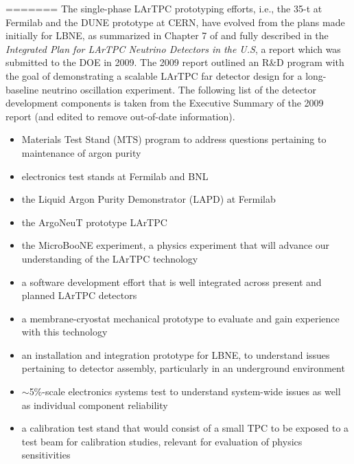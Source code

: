 =======
The single-phase LArTPC prototyping efforts, i.e., the 35-t at Fermilab and the DUNE prototype at CERN, have evolved from the plans made initially for LBNE, as summarized in Chapter 7 of \anxlbnefd{} and fully described in the \textit{Integrated Plan for LArTPC Neutrino Detectors in the U.S}, a report which was submitted to the DOE in 2009.  
The 2009 report outlined an R\&D program with the goal of demonstrating a scalable LArTPC far detector design for a long-baseline neutrino oscillation experiment.  
The following list of the detector development components is taken from the Executive Summary of the 2009 report (and edited to remove out-of-date information).
\begin{itemize}
   \item Materials Test Stand (MTS) program %
   to address questions pertaining to maintenance of argon purity
    \item %
    electronics test stands at Fermilab and BNL
    \item the Liquid Argon Purity Demonstrator (LAPD) %
    at Fermilab
    \item the ArgoNeuT prototype LArTPC %
    \item the MicroBooNE experiment, %
    a physics experiment that will advance our understanding of the LArTPC technology %
    \item a software development effort that is well integrated across present and planned LArTPC detectors
    \item a membrane-cryostat mechanical prototype to evaluate and gain experience with this technology
    \item an installation and integration prototype for LBNE, to understand issues pertaining to detector assembly, particularly in an underground environment
    \item  $\sim$5\%-scale electronics systems test to understand system-wide issues as well as individual component reliability
    \item a calibration test stand that would consist of a small TPC to be exposed to a test beam for calibration studies, relevant for evaluation of physics sensitivities   
\end{itemize}

